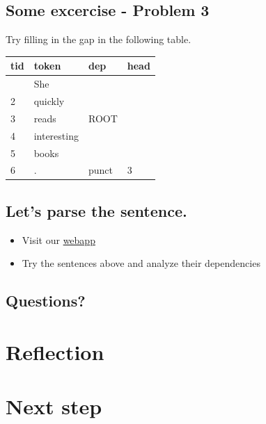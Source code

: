 \documentclass[
  english,
  11pt,
]{article}
\begin{document}
\subsection{Some excercise - Problem
3}\label{some-excercise---problem-3}

Try filling in the gap in the following table.

\begin{longtable}[]{@{}llll@{}}
\toprule\noalign{}
tid & token & dep & head \\
\midrule\noalign{}
\endhead
\bottomrule\noalign{}
\endlastfoot
1 & She & & \\
2 & quickly & & \\
3 & reads & ROOT & \\
4 & interesting & & \\
5 & books & & \\
6 & . & punct & 3 \\
\end{longtable}

\subsection{Let's parse the sentence.}\label{lets-parse-the-sentence.}

\begin{itemize}
\item
  Visit our
  \href{https://huggingface.co/spaces/egumasa/simple-text-analyzer}{webapp}
\item
  Try the sentences above and analyze their dependencies
\end{itemize}

\subsection{Questions?}\label{questions}

\section{Reflection}\label{reflection}

\section{Next step}\label{next-step}
\end{document}
